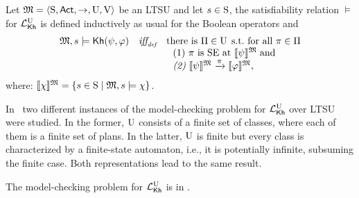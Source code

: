 \begin{definition} \label{def:semantics-kh-uncertain}
    Let $\model = \tup{\S,\Act,\ra,\Unc,\V}$ be an LTSU and let $s\in\S$, the satisfiability relation $\models$ for $\Khunc$ is defined inductively as usual for the Boolean operators and
    \[
    \begin{array}{l@{\ \ \ }c@{\ \ \  }l}
    \model, s \models \kh(\psi,\varphi) & \iffdef & \text{there is } \plans \in \Unc \;\text{s.t.\ for all } \plan\in\plans \\
    & & \ \ \text{\rm (1)} \ \plan \text{ is SE at }  \truthset{\model}{\psi}\; \text{and} \\
    & & \ \ \text{\em (2)} \ \truthset{\model}{\psi} \reach{\plan} \truthset{\model}{\varphi}, 
    \end{array}
    \]      
    where: $\truthset{\model}{\chi} = \csetsc{s\in\S}{\model,s\models\chi}$. 
\end{definition}

In~\cite{AFSVQ21,DF23} two different instances of the model-checking problem for $\Khunc$ over LTSU were studied. In the former, $\Unc$ consists of a finite set of classes, where each of them is a finite set of plans. In the latter, $\Unc$ is finite but every class is characterized by a finite-state automaton, i.e., it is potentially infinite, subsuming the finite case. Both representations lead to the same result.

\begin{proposition}
    The model-checking problem for $\Khunc$ is in \PTIME.
\end{proposition}

